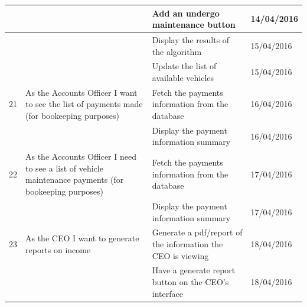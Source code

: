 \documentclass[paper=a4, fontsize=11pt]{scrartcl} %
\numberwithin{equation}{section} %
\numberwithin{figure}{section} %
\numberwithin{table}{section} %
\begin{document}
\begin{table}[!hbt]
\begin{tabular}{|p{1cm}|p{5cm}|p{5cm}|p{2cm}|}
            &                                                                                                        & Add an undergo maintenance button                                                 & 14/04/2016    \\ \hline
            &                                                                                                        & Display the results of the algorithm                                              & 15/04/2016    \\ \hline
            &                                                                                                        & Update the list of available vehicles                                             & 15/04/2016    \\ \hline
21          & As the Accounts Officer I want to see the list of payments made (for bookeeping purposes)              & Fetch the payments information from the database                                  & 16/04/2016    \\ \hline
            &                                                                                                        & Display the payment information summary                                           & 16/04/2016    \\ \hline
22          & As the Accounts Officer I need to see a list of vehicle maintenance payments (for bookeeping purposes) & Fetch the payments information from the database                                  & 17/04/2016    \\ \hline
            &                                                                                                        & Display the payment information summary                                           & 17/04/2016    \\ \hline
23          & As the CEO I want to generate reports on income                                                        & Generate a pdf/report of the information the CEO is viewing                       & 18/04/2016    \\ \hline
            &                                                                                                        & Have a generate report button on the CEO's interface                              & 18/04/2016    \\ \hline
\end{tabular}
\end{table}
\end{document}
